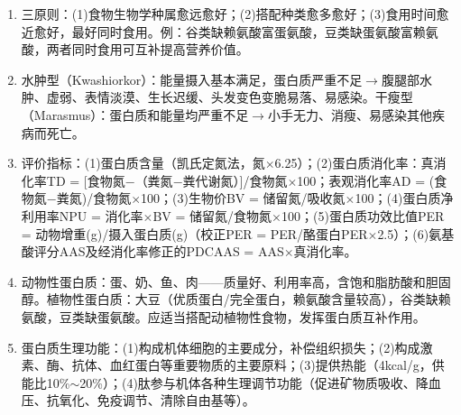 {\begin{enumerate}[leftmargin=*, itemsep=5pt]
    \item 三原则：(1)食物生物学种属愈远愈好；(2)搭配种类愈多愈好；(3)食用时间愈近愈好，最好同时食用。例：谷类缺赖氨酸富蛋氨酸，豆类缺蛋氨酸富赖氨酸，两者同时食用可互补提高营养价值。
    \item 水肿型（Kwashiorkor）：能量摄入基本满足，蛋白质严重不足$\rightarrow$腹腿部水肿、虚弱、表情淡漠、生长迟缓、头发变色变脆易落、易感染。干瘦型（Marasmus）：蛋白质和能量均严重不足$\rightarrow$小手无力、消瘦、易感染其他疾病而死亡。
    \item 评价指标：(1)蛋白质含量（凯氏定氮法，氮$\times$6.25）；(2)蛋白质消化率：真消化率TD = [食物氮$-$（粪氮$-$粪代谢氮）]/食物氮$\times$100；表观消化率AD = (食物氮$-$粪氮)/食物氮$\times$100；(3)生物价BV = 储留氮/吸收氮$\times$100；(4)蛋白质净利用率NPU = 消化率$\times$BV = 储留氮/食物氮$\times$100；(5)蛋白质功效比值PER = 动物增重(g)/摄入蛋白质(g)（校正PER = PER/酪蛋白PER$\times$2.5）；(6)氨基酸评分AAS及经消化率修正的PDCAAS = AAS$\times$真消化率。
    \item 动物性蛋白质：蛋、奶、鱼、肉——质量好、利用率高，含饱和脂肪酸和胆固醇。植物性蛋白质：大豆（优质蛋白/完全蛋白，赖氨酸含量较高），谷类缺赖氨酸，豆类缺蛋氨酸。应适当搭配动植物性食物，发挥蛋白质互补作用。
    \item 蛋白质生理功能：(1)构成机体细胞的主要成分，补偿组织损失；(2)构成激素、酶、抗体、血红蛋白等重要物质的主要原料；(3)提供热能（4kcal/g，供能比10\%$\sim$20\%）；(4)肽参与机体各种生理调节功能（促进矿物质吸收、降血压、抗氧化、免疫调节、清除自由基等）。
\end{enumerate}
}
\newpage
